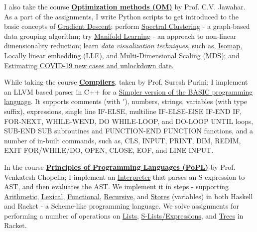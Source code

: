 I also take the course \textbf{\href{https://github.com/iiithf/optimization-methods}{Optimization methods (OM)}} by Prof. C.V. Jawahar. As a part of the assignments, I write Python scripts to get introduced to the basic concepts of \href{https://github.com/python3f/gradient-descent}{Gradient Descent}; perform \href{https://github.com/python3f/spectral-clustering}{Spectral Clustering} - a graph-based data grouping algorithm; try \href{https://github.com/python3f/manifold-learning}{Manifold Learning} - an approach to non-linear dimensionality reduction; learn \textit{data visualization techniques}, such as, \href{https://github.com/python3f/isomap}{Isomap}, \href{https://github.com/python3f/locally-linear-embedding}{Locally linear embedding (LLE)}, and \href{https://github.com/python3f/multidimensional-scaling}{Multi-Dimensional Scaling (MDS)}; and \href{https://github.com/python3f/covid19-estimate}{Estimating COVID-19 new cases and unlockdown date}.

While taking the course \textbf{\href{https://github.com/iiithf/compilers}{Compilers}}, taken by Prof. Suresh Purini; I implement an LLVM based parser in C++ for a \href{https://github.com/cppf/basic-parser}{Simpler version of the BASIC programming language}. It supports comments (with $'$), numbers, strings, variables (with type suffix), expressions, single line IF-ELSE, multiline IF-ELSE-ElSE IF-END IF, FOR-NEXT, WHILE-WEND, DO WHILE-LOOP, and DO-LOOP UNTIL loops, SUB-END SUB subroutines and FUNCTION-END FUNCTION functions, and a number of in-built commands, such as, CLS, INPUT, PRINT, DIM, REDIM, EXIT FOR/WHILE/DO, OPEN, CLOSE, EOF, and LINE INPUT.

In the course \textbf{\href{https://github.com/iiithf/principles-of-programming-languages}{Principles of Programming Languages (PoPL)}} by Prof. Venkatesh Chopella; I implement an \href{https://github.com/haskellc/interpreter}{Interpreter} that parses an S-expression to AST, and then evaluates the AST. We implement it in steps - supporting \href{https://github.com/interpreterz/arithmetic2}{Arithmetic}, \href{https://github.com/interpreterz/lexical}{Lexical}, \href{https://github.com/interpreterz/functional}{Functional}, \href{https://github.com/interpreterz/recursive}{Recursive}, and \href{https://github.com/interpreterz/stores}{Stores} (variables) in both Haskell and Racket - a Scheme-like programming language. We solve assignments for performing a number of operations on \href{https://github.com/racketf/lists-assignment}{Lists}, \href{https://github.com/racketf/lists-quiz}{S-Lists/Expressions}, and \href{https://github.com/racketf/trees-assignment}{Trees} in Racket.

